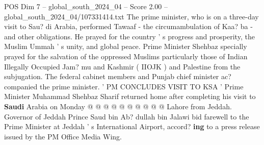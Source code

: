 \begin{textsample}{POS Dim 7 – global\_south\_2024\_04 – Score 2.00 – global\_south\_2024\_04/107331414.txt}
The prime minister, who is on a three-day visit to Sau? di Arabia, performed Tawaaf - the circumambulation of Kaa? ba - and other obligations.
He prayed for the country ' s progress and prosperity, the Muslim Ummah ' s unity, and global peace.
Prime Minister Shehbaz specially prayed for the salvation of the oppressed Muslims particularly those of Indian Illegally Occupied Jam? mu and Kashmir ( IIOJK ) and Palestine from the subjugation.
The federal cabinet members and Punjab chief minister ac? companied the prime minister. ' PM CONCLUDES VISIT TO KSA ' Prime Minister Muhammad Shehbaz Sharif returned home after completing his visit to \textbf{Saudi} Arabia on Monday @ @ @ @ @ @ @ @ @ @ Lahore from Jeddah.
Governor of Jeddah Prince Saud bin Ab? dullah bin Jalawi bid farewell to the Prime Minister at Jeddah ' s International Airport, accord? \textbf{ing} to a press release issued by the PM Office Media Wing.

\end{textsample}
